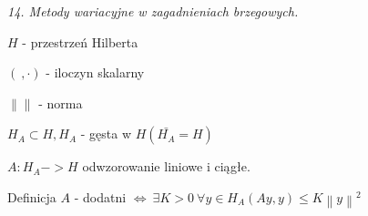 \textit{14. Metody wariacyjne w zagadnieniach brzegowych.}

$H$ - przestrzeń Hilberta

$(\ ,\cdot)$ - iloczyn skalarny

$\left \|  \right \|$ - norma

$H_A \subset H, H_A$ - gęsta w $H (\bar{H_A} = H)$

$A: H_A -> H$ odwzorowanie liniowe i ciągłe.

Definicja
$A$ - dodatni $\Leftrightarrow\ \exists K > 0\ \forall y \in H_A (Ay,y) \leqslant K \left \| y \right \| ^ 2$